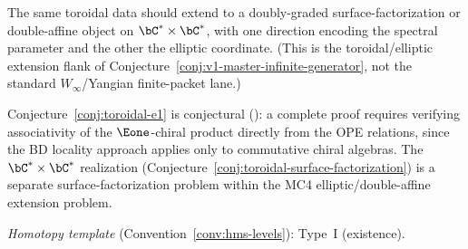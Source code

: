 \begin{conjecture}
\label{conj:toroidal-surface-factorization}
The same toroidal data should extend to a doubly-graded
surface-factorization or double-affine object on
$\bC^* \times \bC^*$, with one direction encoding the spectral
parameter and the other the elliptic coordinate.
(This is the toroidal/elliptic extension flank of
Conjecture~\ref{conj:v1-master-infinite-generator}, not the standard
$W_\infty$/Yangian finite-packet lane.)
\end{conjecture}

\begin{remark}[Scope]
Conjecture~\ref{conj:toroidal-e1} is conjectural (\ClaimStatusConjectured): a complete proof requires verifying associativity of the $\Eone$-chiral product directly from the OPE relations, since the BD locality approach applies only to commutative chiral algebras. The $\bC^* \times \bC^*$ realization (Conjecture~\ref{conj:toroidal-surface-factorization}) is a separate surface-factorization problem within the MC4 elliptic/double-affine extension problem.

\emph{Homotopy template} (Convention~\ref{conv:hms-levels}): Type~I (existence).
\end{remark}

